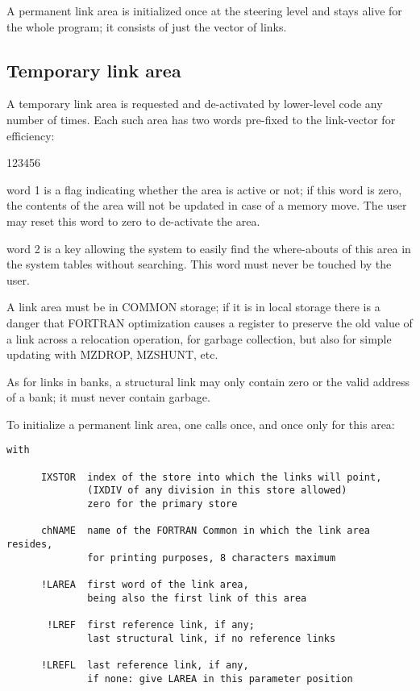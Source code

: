 A permanent link area is initialized once at the steering level
and stays alive for the whole program;
it consists of just the vector of links.

\subsection*{Temporary link area}

A temporary link area is requested and de-activated
by lower-level code any number of times.
Each such area has two words pre-fixed to the link-vector
for efficiency:

\begin{DLtt}{123456}
\item[word 1] is a flag indicating whether the area is active or not;
              if this word is zero, the contents of the area will
              not be updated in case of a memory move.
              The user may reset this word to zero to de-activate the area.
\item[word 2] is a key allowing the system to easily find the
              where-abouts of this area in the system tables without searching.
              This word must never be touched by the user.
\end{DLtt}

A link area must be in COMMON storage;
if it is in local storage there is a danger that FORTRAN
optimization causes a register to preserve the old value of a link
across a relocation operation,
for garbage collection,
but also for simple updating with MZDROP, MZSHUNT, etc.

As for links in banks, a structural link may only contain zero or the
valid address of a bank; it must never contain garbage.

To initialize a permanent link area, one calls once,
and once only for this area:

\begin{verbatim}
with

      IXSTOR  index of the store into which the links will point,
              (IXDIV of any division in this store allowed)
              zero for the primary store

      chNAME  name of the FORTRAN Common in which the link area resides,
              for printing purposes, 8 characters maximum

      !LAREA  first word of the link area,
              being also the first link of this area

       !LREF  first reference link, if any;
              last structural link, if no reference links

      !LREFL  last reference link, if any,
              if none: give LAREA in this parameter position
\end{verbatim} 

